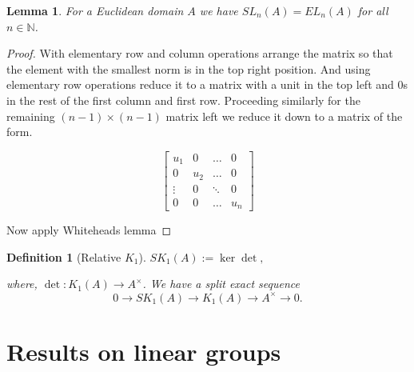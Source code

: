 \documentclass[12pt]{report}
\numberwithin{equation}{section}
\newcommand{\N}{\mathbb{N}}
\newcounter{dummy} \numberwithin{dummy}{section}
\newtheorem{theorem}[dummy]{Theorem}
\newtheorem{definition}[dummy]{Definition}
\newtheorem{lemma}[dummy]{Lemma}
\begin{document}
	\begin{lemma}
		For a Euclidean domain $A$ we have $SL_n(A)=EL_n(A)$ for all $n \in \N$.
	\end{lemma}
	\begin{proof}
		With elementary row and column operations arrange the matrix so that the element with the smallest norm is in the top right position. And using elementary row operations reduce it to a matrix with a unit in the top left and 0s in the rest of the first column and first row. Proceeding similarly for the remaining $(n-1) \times (n-1) $ matrix left we reduce it down to a matrix of the form.
		
		\[ \begin{bmatrix}
			u_1 & 0 & \dots & 0 \\
			0 & u_2 & \dots & 0 \\
			\vdots & 0 & \ddots & 0\\
			0 & 0 & \dots & u_n 
		\end{bmatrix} \]
		
		Now apply Whiteheads lemma 
	\end{proof}
	
	\begin{definition}[Relative $K_1$]
		$SK_1(A):= \ker \det,$
		
		where, $\det : K_1(A) \to A^\times$. We have a split exact sequence
		\[ 0 \to SK_1(A) \to K_1(A) \to A^\times \to 0 .\]
	\end{definition}
	
	
	\chapter{Results on linear groups}
	
\end{document}
